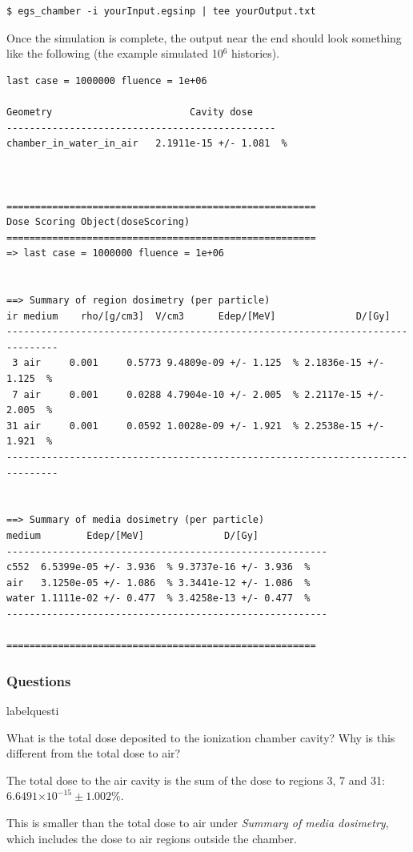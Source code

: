 \documentclass[12pt,twoside]{article}
\makeatletter
\renewcommand\thequesti         {\@arabic\c@questi}
\newenvironment{question}{
    \bfseries
    \edef\@questictr{questi}
    \expandafter
    \list \csname label\@questictr\endcsname {
        \usecounter\@questictr\def\makelabel##1{\hss\llap{##1}}
        \savebox{\questbox}             {\thequesti}
        \setlength\labelsep             {0.6em}
        \setlength\labelwidth           {\wd\questbox}
        \setlength\leftmargini          {\labelwidth}
        \addtolength{\leftmargini}      {\labelsep}
        \addtolength{\leftmargini}      {0.2em}
        \leftmargin\leftmargini
        \setlength\topsep               {1em}
        \setlength\itemsep              {1.2em}
        \setlength\parsep               {0.5em}
    }
}{\normalfont\endlist}
\newenvironment{answer}{\normalfont}{\relax}
\providecommand{\e}[1]{\ensuremath{\times 10^{#1}}}
\makeatother
\begin{document}
\begin{lstlisting}
$ egs_chamber -i yourInput.egsinp | tee yourOutput.txt
\end{lstlisting}

Once the simulation is complete, the output near the end should look something
like the following (the example simulated 10$^6$ histories).

{\scriptsize
\begin{lstlisting}[language={},backgroundcolor=\color{white}]
 last case = 1000000 fluence = 1e+06

Geometry                        Cavity dose
-----------------------------------------------
chamber_in_water_in_air   2.1911e-15 +/- 1.081  %



======================================================
Dose Scoring Object(doseScoring)
======================================================
=> last case = 1000000 fluence = 1e+06


==> Summary of region dosimetry (per particle)
ir medium    rho/[g/cm3]  V/cm3      Edep/[MeV]              D/[Gy]
-------------------------------------------------------------------------------
 3 air     0.001     0.5773 9.4809e-09 +/- 1.125  % 2.1836e-15 +/- 1.125  %
 7 air     0.001     0.0288 4.7904e-10 +/- 2.005  % 2.2117e-15 +/- 2.005  %
31 air     0.001     0.0592 1.0028e-09 +/- 1.921  % 2.2538e-15 +/- 1.921  %
-------------------------------------------------------------------------------


==> Summary of media dosimetry (per particle)
medium        Edep/[MeV]              D/[Gy]
--------------------------------------------------------
c552  6.5399e-05 +/- 3.936  % 9.3737e-16 +/- 3.936  %
air   3.1250e-05 +/- 1.086  % 3.3441e-12 +/- 1.086  %
water 1.1111e-02 +/- 0.477  % 3.4258e-13 +/- 0.477  %
--------------------------------------------------------

======================================================
\end{lstlisting}
}


\subsubsection{Questions}

\begin{question}

\item What is the total dose deposited to the ionization chamber cavity? Why is
this different from the total dose to air?

\begin{answer}
The total dose to the air cavity is the sum of the dose to regions 3, 7 and 31:
$6.6491\e{-15} \pm 1.002\%$.

This is smaller than the total dose to air under
\textit{Summary of media dosimetry}, which includes the dose to air regions
outside the chamber.
\end{answer}

\end{question}
\end{document}
